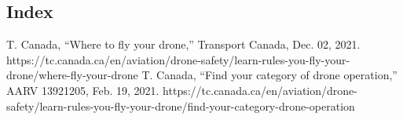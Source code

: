 \documentclass{article}
\begin{document}
\subsection{Index}



\begin{thebibliography}{9}


T. Canada, “Where to fly your drone,” Transport Canada, Dec. 02, 2021. https://tc.canada.ca/en/aviation/drone-safety/learn-rules-you-fly-your-drone/where-fly-your-drone
‌
T. Canada, “Find your category of drone operation,” AARV 13921205, Feb. 19, 2021. https://tc.canada.ca/en/aviation/drone-safety/learn-rules-you-fly-your-drone/find-your-category-drone-operation
\end{thebibliography}
\end{document}
